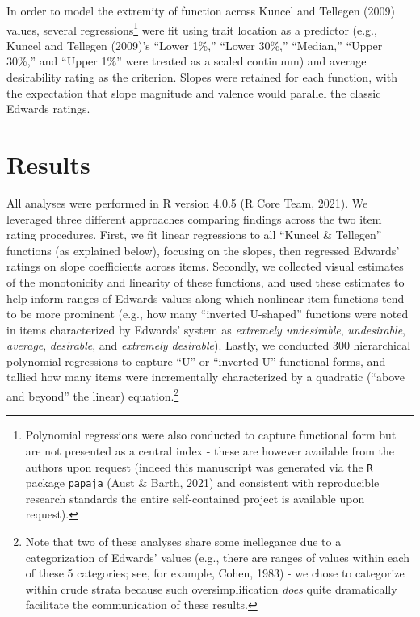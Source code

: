 \documentclass[
  english,
  ,jou]{apa6}
\begin{document}
In order to model the extremity of function across Kuncel and Tellegen (2009) values, several regressions\footnote{Polynomial regressions were also conducted to capture functional form but are not presented as a central index - these are however available from the authors upon request (indeed this manuscript was generated via the \texttt{R} package \texttt{papaja} (Aust \& Barth, 2021) and consistent with reproducible research standards the entire self-contained project is available upon request).} were fit using trait location as a predictor (e.g., Kuncel and Tellegen (2009)'s ``Lower 1\%,'' ``Lower 30\%,'' ``Median,'' ``Upper 30\%,'' and ``Upper 1\%'' were treated as a scaled continuum) and average desirability rating as the criterion. Slopes were retained for each function, with the expectation that slope magnitude and valence would parallel the classic Edwards ratings.

\hypertarget{results}{%
\section{Results}\label{results}}

All analyses were performed in R version 4.0.5 (R Core Team, 2021). We leveraged three different approaches comparing findings across the two item rating procedures. First, we fit linear regressions to all ``Kuncel \& Tellegen'' functions (as explained below), focusing on the slopes, then regressed Edwards' ratings on slope coefficients across items. Secondly, we collected visual estimates of the monotonicity and linearity of these functions, and used these estimates to help inform ranges of Edwards values along which nonlinear item functions tend to be more prominent (e.g., how many ``inverted U-shaped'' functions were noted in items characterized by Edwards' system as \emph{extremely undesirable}, \emph{undesirable}, \emph{average}, \emph{desirable}, and \emph{extremely desirable}). Lastly, we conducted 300 hierarchical polynomial regressions to capture ``U'' or ``inverted-U'' functional forms, and tallied how many items were incrementally characterized by a quadratic (``above and beyond'' the linear) equation.\footnote{Note that two of these analyses share some inellegance due to a categorization of Edwards' values (e.g., there are ranges of values within each of these 5 categories; see, for example, Cohen, 1983) - we chose to categorize within crude strata because such oversimplification \emph{does} quite dramatically facilitate the communication of these results.}
\end{document}

